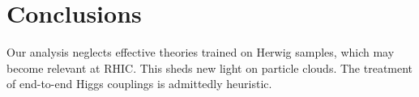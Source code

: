 \section{Conclusions}\label{sec:conclusions}

Our analysis neglects effective theories trained on Herwig samples,
which may become relevant at RHIC. This sheds new light on particle
clouds. The treatment of end-to-end Higgs couplings is admittedly
heuristic.

